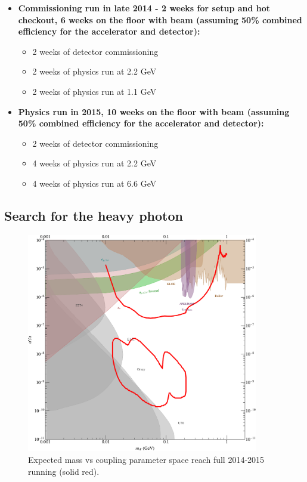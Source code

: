 \begin{itemize}
\item {\bf Commissioning run in late 2014 - 2 weeks for setup and hot checkout, 6 weeks on the floor with beam (assuming 50\% combined efficiency for the accelerator and detector):}
\begin{itemize}
\item 2 weeks of detector commissioning
\item 2 weeks of physics run at 2.2 GeV 
\item 2 weeks of physics run at 1.1 GeV
\end{itemize}
\item{\bf Physics run in 2015, 10 weeks on the floor with beam (assuming 50\% combined efficiency for the accelerator and detector):}
\begin{itemize}
\item 2 weeks of detector commissioning
\item 4 weeks of physics run at 2.2 GeV
\item 4 weeks of physics run at 6.6 GeV
\end{itemize}
\end{itemize}


\subsection{Search for the heavy photon}
\def \ap {A^\prime}
\def \map {m_{A^\prime}}
\def \thap {\theta_{A^\prime}}
\label{sec:apsignal}

\begin{figure}
\includegraphics[width=0.9\textwidth]{measurements/HPS-Proposal2014-SimpleReach.pdf}
\caption{Expected mass vs coupling parameter space reach  full 2014-2015 running (solid red).}
\label{fig:reach}
\end{figure}

